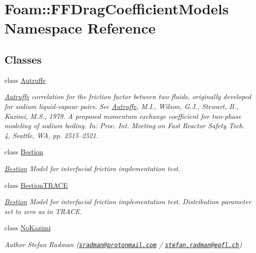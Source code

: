 \hypertarget{namespaceFoam_1_1FFDragCoefficientModels}{}\section{Foam\+:\+:F\+F\+Drag\+Coefficient\+Models Namespace Reference}
\label{namespaceFoam_1_1FFDragCoefficientModels}
\subsection*{Classes}
\begin{DoxyCompactItemize}
\item 
class \hyperlink{classFoam_1_1FFDragCoefficientModels_1_1Autruffe}{Autruffe}
\begin{DoxyCompactList}\small\item\em \hyperlink{classFoam_1_1FFDragCoefficientModels_1_1Autruffe}{Autruffe} correlation for the friction factor between two fluids, originally developed for sodium liquid-\/vapour pairs. See \hyperlink{classFoam_1_1FFDragCoefficientModels_1_1Autruffe}{Autruffe}, M.\+I., Wilson, G.\+J., Stewart, B., Kazimi, M.\+S., 1979. A proposed momentum exchange coefficient for two-\/phase modeling of sodium boiling. In\+: Proc. Int. Meeting on Fast Reactor Safety Tech. 4, Seattle, WA, pp. 2515–2521. \end{DoxyCompactList}\item 
class \hyperlink{classFoam_1_1FFDragCoefficientModels_1_1Bestion}{Bestion}
\begin{DoxyCompactList}\small\item\em \hyperlink{classFoam_1_1FFDragCoefficientModels_1_1Bestion}{Bestion} Model for interfacial friction implementation test. \end{DoxyCompactList}\item 
class \hyperlink{classFoam_1_1FFDragCoefficientModels_1_1BestionTRACE}{Bestion\+T\+R\+A\+CE}
\begin{DoxyCompactList}\small\item\em \hyperlink{classFoam_1_1FFDragCoefficientModels_1_1Bestion}{Bestion} Model for interfacial friction implementation test. Distribution parameter set to zero as in T\+R\+A\+CE. \end{DoxyCompactList}\item 
class \hyperlink{classFoam_1_1FFDragCoefficientModels_1_1NoKazimi}{No\+Kazimi}
\begin{DoxyCompactList}\small\item\em Author Stefan Radman (\href{mailto:sradman@protonmail.com}{\tt sradman@protonmail.\+com} / \href{mailto:stefan.radman@epfl.ch}{\tt stefan.\+radman@epfl.\+ch}) \end{DoxyCompactList}\item 

\end{DoxyCompactItemize}
